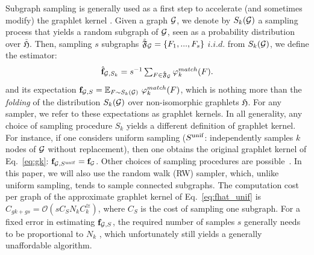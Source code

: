 \documentclass{article}
\begin{document}
Subgraph sampling is generally used as a first step to accelerate (and sometimes modify) the graphlet kernel \cite{graphlet_kernel}. Given a graph $\mathcal{G}$, we denote by $S_k(\mathcal{G})$ a sampling process that yields a random subgraph of $\mathcal{G}$, seen as a probability distribution over $\bar{\mathfrak{H}}$. %
Then, sampling $s$ subgraphs $\hat{\mathfrak{F}}_{\mathcal{G}} = \{F_1,...,F_s\}$ $i.i.d.$ from $S_k(\mathcal{G})$, we define the estimator:
\begin{align}
	\label{eq:fhat_unif}
	\mathsmaller{\hat{\mathbf{f}}_{\mathcal{G},S_k} =s^{-1}\sum_{F\in\hat{\mathfrak{F}}_\G} \varphi^{match}_k(F).}
\end{align}
and its expectation $\mathbf{f}_{\mathcal{G},S} = \mathbb{E}_{F \sim S_k(\mathcal{G})} ~\varphi^{match}_k(F)$, which is nothing more than the \emph{folding} of the distribution $S_k(\mathcal{G})$ over non-isomorphic graphlets $\mathfrak{H}$. For any sampler, we refer to these expectations as graphlet kernels. In all generality, any choice of sampling procedure $S_k$ yields a different definition of graphlet kernel. For instance, if one considers uniform sampling ($S^{\rm unif}$: independently samples $k$ nodes of $\mathcal{G}$ without replacement), then one obtains the original graphlet kernel of Eq.~\eqref{eq:gk}: $\mathbf{f}_{\mathcal{G}, S^{\rm unif}} = \mathbf{f}_{\mathcal{G}}$. Other choices of sampling procedures are possible~\cite{leskovec2006sampling}. In this paper, we will also use the random walk (RW) sampler, which, unlike uniform sampling, tends to sample connected subgraphs. %
%
The computation cost per graph of the approximate graphlet kernel of Eq.~\eqref{eq:fhat_unif} is $C_{gk + gs}= \mathcal{O}\left(s C_S N_k C^{\cong}_k\right)$, where $C_S$ is the cost of sampling one subgraph. %
For a fixed error in estimating $\mathbf{f}_{\mathcal{G},S}$, the required number of samples $s$ generally needs to be proportional to $N_k$ \cite{graphlet_kernel}, which unfortunately still yields a generally unaffordable algorithm.


\end{document}
